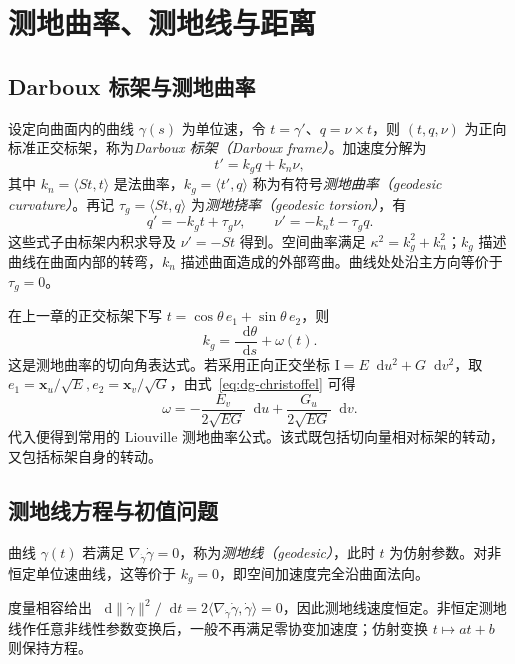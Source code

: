 \documentclass[UTF8,12pt,a4paper,fontset=fandol]{ctexbook}
\newcommand{\dd}{\mathop{}\!\mathrm d}
\newcommand{\ip}[2]{\langle #1,#2\rangle}
\newcommand{\norm}[1]{\lVert #1\rVert}
\begin{document}
\chapter{测地曲率、测地线与距离}
\label{chap:dg-geodesics}

\section{Darboux 标架与测地曲率}
设定向曲面内的曲线 $\gamma(s)$ 为单位速，令 $t=\gamma'$、$q=\nu\times t$，则 $(t,q,\nu)$ 为正向标准正交标架，称为\emph{Darboux 标架（Darboux frame）}。加速度分解为
\begin{equation}
 t'=k_gq+k_n\nu,
 \label{eq:dg-darboux-first}
\end{equation}
其中 $k_n=\ip{St}t$ 是法曲率，$k_g=\ip{t'}q$ 称为有符号\emph{测地曲率（geodesic curvature）}。再记 $\tau_g=\ip{St}q$ 为\emph{测地挠率（geodesic torsion）}，有
\[
 q'=-k_gt+\tau_g\nu,\qquad \nu'=-k_nt-\tau_gq.
\]
这些式子由标架内积求导及 $\nu'=-St$ 得到。空间曲率满足 $\kappa^2=k_g^2+k_n^2$；$k_g$ 描述曲线在曲面内部的转弯，$k_n$ 描述曲面造成的外部弯曲。曲线处处沿主方向等价于 $\tau_g=0$。

在上一章的正交标架下写 $t=\cos\theta\,e_1+\sin\theta\,e_2$，则
\begin{equation}
 k_g=\frac{\dd\theta}{\dd s}+\omega(t).
 \label{eq:dg-kg-angle}
\end{equation}
这是测地曲率的切向角表达式。若采用正向正交坐标 $\mathrm I=E\dd u^2+G\dd v^2$，取 $e_1=\mathbf x_u/\sqrt E,e_2=\mathbf x_v/\sqrt G$，由式~\eqref{eq:dg-christoffel} 可得
\[
 \omega=-\frac{E_v}{2\sqrt{EG}}\dd u+
          \frac{G_u}{2\sqrt{EG}}\dd v.
\]
代入便得到常用的 Liouville 测地曲率公式。该式既包括切向量相对标架的转动，又包括标架自身的转动。

\section{测地线方程与初值问题}
\begin{definition}[仿射参数测地线]
曲线 $\gamma(t)$ 若满足 $\nabla_{\dot\gamma}\dot\gamma=0$，称为\emph{测地线（geodesic）}，此时 $t$ 为仿射参数。对非恒定单位速曲线，这等价于 $k_g=0$，即空间加速度完全沿曲面法向。
\end{definition}
度量相容给出 $\dd\norm{\dot\gamma}^2/\dd t=2\ip{\nabla_{\dot\gamma}\dot\gamma}{\dot\gamma}=0$，因此测地线速度恒定。非恒定测地线作任意非线性参数变换后，一般不再满足零协变加速度；仿射变换 $t\mapsto at+b$ 则保持方程。
\end{document}
